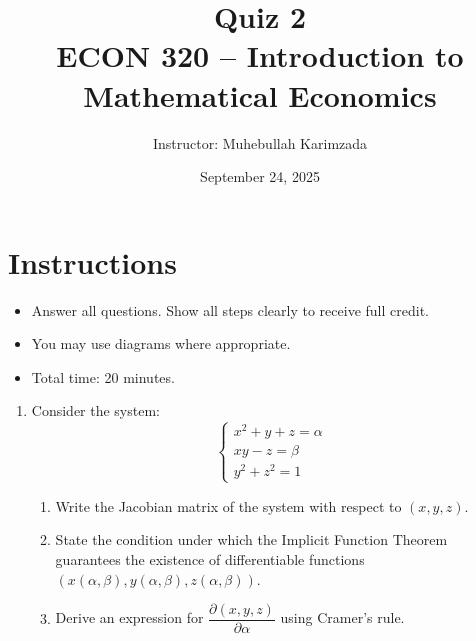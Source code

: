 \documentclass[12pt]{article}
\title{Quiz 2\\ \vspace{10pt}
\large ECON 320 -- Introduction to Mathematical Economics}
\author{Instructor: Muhebullah Karimzada}
\date{September 24, 2025}
\begin{document}
\maketitle

\section*{Instructions}
\begin{itemize}
    \item Answer all questions. Show all steps clearly to receive full credit.
    \item You may use diagrams where appropriate.
    \item Total time: 20 minutes.
\end{itemize}

\hrulefill
\begin{enumerate}


\item Consider the system:
\[
\begin{cases}
x^2 + y + z = \alpha \\
xy - z = \beta \\
y^2 + z^2 = 1
\end{cases}
\]
\begin{enumerate}[label=(\alph*)]
\item Write the Jacobian matrix of the system with respect to $(x,y,z)$.
\item State the condition under which the Implicit Function Theorem guarantees the existence of differentiable functions $(x(\alpha,\beta), y(\alpha,\beta), z(\alpha,\beta))$.
\item Derive an expression for $\dfrac{\partial (x,y,z)}{\partial \alpha}$ using Cramer’s rule.
\end{enumerate}


\end{enumerate}
\end{document}
